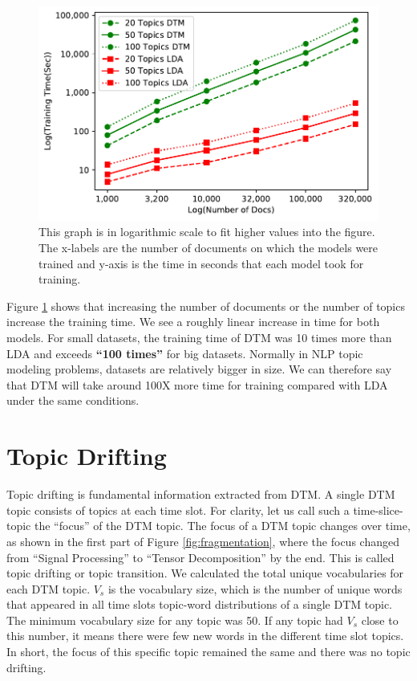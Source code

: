 \documentclass[a4paper]{report}
\begin{document}
\begin{figure}[h!]
\begin{center}
\includegraphics[scale=0.8]{costGraph.pdf}
\caption{This graph is in logarithmic scale to fit higher values into the figure. The x-labels are the number of documents on which the models were trained and y-axis is the time in seconds that each model took for training.}
\label{fig:trainingTime}
\end{center}
\end{figure}

Figure \ref{fig:trainingTime} shows that increasing the number of documents or the number of topics increase the training time. We see a roughly linear increase in time for both models. For small datasets, the training time of DTM was 10 times more than LDA and exceeds \textbf{``100 times''} for big datasets. Normally in NLP topic modeling problems, datasets are relatively bigger in size. We can therefore say that DTM will take around 100X more time for training compared with LDA under the same conditions.

\section{Topic Drifting}
Topic drifting is fundamental information extracted from DTM. A single DTM topic consists of topics at each time slot. For clarity, let us call such a time-slice-topic the ``focus'' of the DTM topic. The focus of a DTM topic changes over time, as shown in the first part of Figure \ref{fig:fragmentation}, where the focus changed from ``Signal Processing'' to ``Tensor Decomposition'' by the end. This is called topic drifting or topic transition. We calculated the total unique vocabularies for each DTM topic. $V_s$ is the vocabulary size, which is the number of unique words that appeared in all time slots topic-word distributions of a single DTM topic. The minimum vocabulary size for any topic was 50. If any topic had $V_s$ close to this number, it means there were few new words in the different time slot topics. In short, the focus of this specific topic remained the same and there was no topic drifting.
\end{document}
